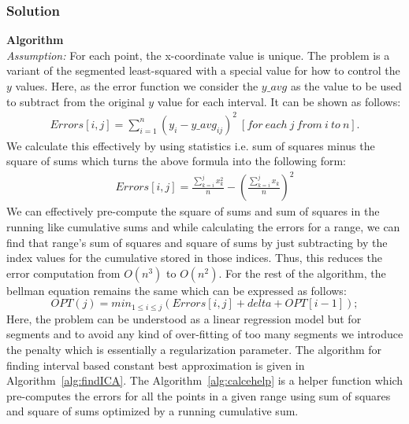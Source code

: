 \documentclass{article}
\begin{document}
\subsubsection*{Solution}
\textbf{Algorithm}\\
\textit{Assumption:} For each point, the x-coordinate value is unique.
The problem is a variant of the segmented least-squared with a special value for how to control the $y$ values. Here, as the error function we consider the $y\_avg$ as the value to be used to subtract from the original $y$ value for each interval. It can be shown as follows:
\begin{align*}
    Errors[i,j] = \sum_{i=1}^{n} (y_i-y\_avg_{ij})^2\ [for\ each\ j\ from\ i\ to\ n].
\end{align*}
We calculate this effectively by using statistics i.e. sum of squares minus the square of sums which turns the above formula into the following form:
\begin{align*}
    Errors[i,j] = \frac{\sum_{k=i}^{j}x_k^2}{n} - \left(\frac{\sum_{k=i}^{j}x_k}{n} \right) ^2
\end{align*}
We can effectively pre-compute the square of sums and sum of squares in the running like cumulative sums and while calculating the errors for a range, we can find that range's sum of squares and square of sums by just subtracting by the index values for the cumulative stored in those indices. Thus, this reduces the error computation from $O(n^3)$ to $O(n^2)$. For the rest of the algorithm, the bellman equation remains the same which can be expressed as follows:
\begin{equation}
    OPT(j) = min_{1\leq i\leq j}(Errors[i,j]+delta+OPT[i-1]);
\end{equation}
Here, the problem can be understood as a linear regression model but for segments and to avoid any kind of over-fitting of too many segments we introduce the penalty which is essentially a regularization parameter. 
 The algorithm for finding interval based constant best approximation is given in Algorithm~\ref{alg:findICA}. The Algorithm~\ref{alg:calcehelp}
is a helper function which pre-computes the errors for all the points in a given range using sum of squares and square of sums optimized by a running cumulative sum.
\end{document}
